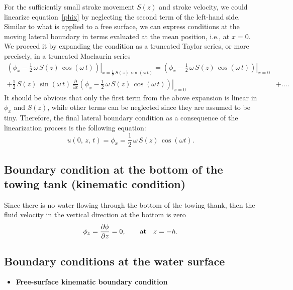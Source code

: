 \documentclass[12pt,a4paper]{report}
\begin{document}
For the sufficiently small stroke movement $S(z)$ and stroke velocity, we could linearize equation~\eqref{phix} by neglecting the second term of the left-hand side. Similar to what is applied to a free surface, we can express conditions at the moving lateral boundary in terms evaluated at the mean position, i.e., at $x = 0$. We proceed it by expanding the condition as a truncated Taylor series, or more precisely, in a truncated Maclaurin series
\begin{align}
\displaystyle \left. \left(\phi_{x} - \frac{1}{2} \, \omega \, S(z) \, \cos (\omega\,t) \right) \right|_{x = \frac{1}{2} \, S(z) \, \sin (\omega\,t)} = \left.\left(\phi_{x} - \frac{1}{2} \, \omega \, S(z) \, \cos (\omega\, t) \right) \right|_{x=0} & \nonumber \\
+ \frac{1}{2} \, S(z) \, \sin (\omega\,t) \, \frac{\partial}{\partial x} \left. \left(\phi_{x} - \frac{1}{2} \, \omega \, S(z) \, \cos (\omega\, t) \right) \right|_{x=0} & + \dots.
\end{align}
It should be obvious that only the first term from the above expansion is linear in $\phi_{x}$ and $S(z)$, while other terms can be neglected since they are assumed to be tiny. Therefore, the final lateral boundary condition as a consequence of the linearization process is the following equation:
\begin{equation}
u(0,\,z,\,t) = \phi_{x} = \frac{1}{2} \, \omega \, S(z) \, \cos(\omega t).
\end{equation}

\subsection{Boundary condition at the bottom of the towing tank (kinematic condition)}

Since there is no water flowing through the bottom of the towing thank, then the fluid velocity in the vertical direction at the bottom is zero
\begin{equation}
\phi_{z} = \frac{\partial\phi}{\partial z} = 0, \qquad \textmd{at} \quad z = -h.
\end{equation}

\subsection{Boundary conditions at the water surface}

\begin{itemize}[leftmargin=1.2em]
\item \textbf{Free-surface kinematic boundary condition}
\end{itemize}
\end{document}
